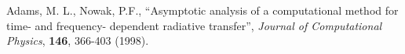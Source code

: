 

\begin{thebibliography}{Wac 75}

\vskip0.1in

 Adams, M. L., Nowak, P.F.,
	``Asymptotic analysis of a computational method for time- and frequency- dependent radiative transfer'', 
	\emph{Journal of Computational Physics},
	\textbf{146}, 366-403 (1998).

\end{thebibliography}

